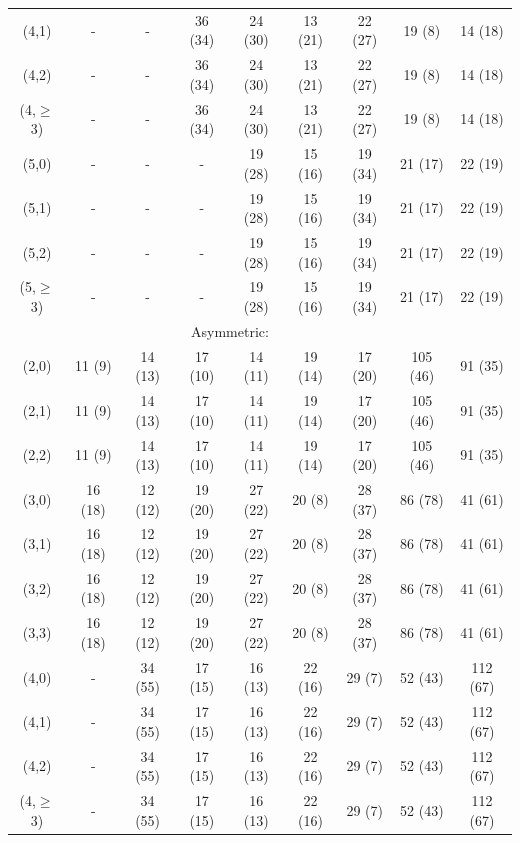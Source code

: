 \begin{table}[h!]
\begin{tabular}{ ccccccccc }
    (4,1)       & -       & -       & 36 (34) & 24 (30) & 13 (21) & 22 (27) & 19 (8)   & 14 (18)   \\
    (4,2)       & -       & -       & 36 (34) & 24 (30) & 13 (21) & 22 (27) & 19 (8)   & 14 (18)   \\
    (4,$\geq$3) & -       & -       & 36 (34) & 24 (30) & 13 (21) & 22 (27) & 19 (8)   & 14 (18)   \\
    (5,0)       & -       & -       & -       & 19 (28) & 15 (16) & 19 (34) & 21 (17)  & 22 (19)   \\
    (5,1)       & -       & -       & -       & 19 (28) & 15 (16) & 19 (34) & 21 (17)  & 22 (19)   \\
    (5,2)       & -       & -       & -       & 19 (28) & 15 (16) & 19 (34) & 21 (17)  & 22 (19)   \\
    (5,$\geq$3) & -       & -       & -       & 19 (28) & 15 (16) & 19 (34) & 21 (17)  & 22 (19)   \\
    \hline
    \multicolumn{8}{c}{Asymmetric:}                                                                \\
    (2,0)       & 11 (9)  & 14 (13) & 17 (10) & 14 (11) & 19 (14) & 17 (20) & 105 (46) & 91   (35) \\
    (2,1)       & 11 (9)  & 14 (13) & 17 (10) & 14 (11) & 19 (14) & 17 (20) & 105 (46) & 91   (35) \\
    (2,2)       & 11 (9)  & 14 (13) & 17 (10) & 14 (11) & 19 (14) & 17 (20) & 105 (46) & 91   (35) \\
    (3,0)       & 16 (18) & 12 (12) & 19 (20) & 27 (22) & 20 (8)  & 28 (37) & 86 (78)  & 41   (61) \\
    (3,1)       & 16 (18) & 12 (12) & 19 (20) & 27 (22) & 20 (8)  & 28 (37) & 86 (78)  & 41   (61) \\
    (3,2)       & 16 (18) & 12 (12) & 19 (20) & 27 (22) & 20 (8)  & 28 (37) & 86 (78)  & 41   (61) \\
    (3,3)       & 16 (18) & 12 (12) & 19 (20) & 27 (22) & 20 (8)  & 28 (37) & 86 (78)  & 41   (61) \\
    (4,0)       & -       & 34 (55) & 17 (15) & 16 (13) & 22 (16) & 29 (7)  & 52 (43)  & 112  (67) \\
    (4,1)       & -       & 34 (55) & 17 (15) & 16 (13) & 22 (16) & 29 (7)  & 52 (43)  & 112  (67) \\
    (4,2)       & -       & 34 (55) & 17 (15) & 16 (13) & 22 (16) & 29 (7)  & 52 (43)  & 112  (67) \\
    (4,$\geq$3) & -       & 34 (55) & 17 (15) & 16 (13) & 22 (16) & 29 (7)  & 52 (43)  & 112  (67) \\

\end{tabular}
\end{table}
